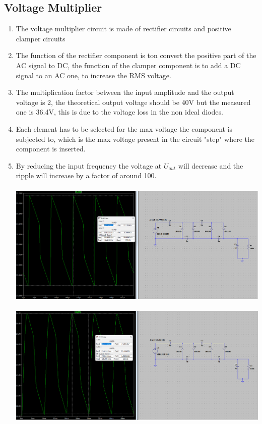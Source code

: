 \documentclass{article}
\begin{document}
			\subsection{Voltage Multiplier}
				\begin{enumerate}
					\item The voltage multiplier circuit is made of rectifier circuits and positive clamper circuits
					\item The function of the rectifier component is ton convert the positive part of the AC signal to DC, the function of the clamper component is to add a DC signal to an AC one, to increase the RMS voltage.
					\item The multiplication factor between the input amplitude and the output voltage is 2, the theoretical output voltage should be 40V but the measured one is 36.4V, this is due to the voltage loss in the non ideal diodes.
					\item Each element has to be selected for the max voltage the component is subjected to, which is the max voltage present in the circuit "step" where the component is inserted.
					\item By reducing the input frequency the voltage at \(U_{out}\) will decrease and the ripple will increase by a factor of around 100.\\\\
					\includegraphics[scale=0.35]{multiplier 10k}\\\\
					\includegraphics[scale=0.35]{multiplier 100}
				\end{enumerate}
				
				
				
				
				
				
				
				
		
				
\end{document}
